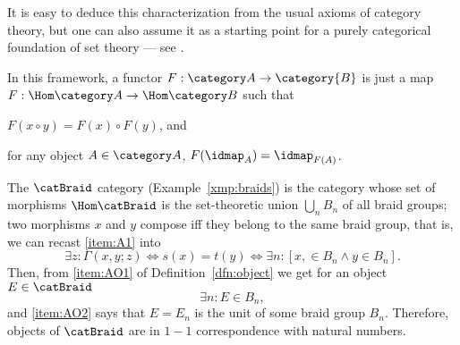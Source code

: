 It is easy to deduce this characterization from the usual axioms of
category theory, but one can also assume it as a starting point for a
purely categorical foundation of set theory --- see
\cite{lawvere;1965}. 

In this framework, a functor $F: \A \to \category{B}$ is just a map $F:
\Hom\A \to \Hom\B$ such that
\begin{inparaenum}
\item $F(x \circ y) = F(x) \circ F(y)$, and
\item for any object $A \in \A$, $F(\idmap_A) = \idmap_{F(A)}$.
\end{inparaenum}

\begin{example}\label{xmp:braid-by-arrows}
  The $\catBraid$ category (Example~\ref{xmp:braids}) is the category whose
  set of morphisms $\Hom\catBraid$ is the set-theoretic union $\bigcup_n
  B_n$ of all braid groups; two morphisms $x$ and $y$ compose iff they
  belong to the same braid group, that is, we can recast \ref{item:A1}
  into
  \begin{equation*}
    \exists z: \Gamma(x,y;z) \Leftrightarrow s(x) = t(y) \Leftrightarrow \exists n: [x, \in B_n \land y \in B_n].
  \end{equation*}
  Then, from \ref{item:AO1} of Definition~\ref{dfn:object} we get for an object
  $E \in \catBraid$
  \begin{equation*}
    \exists n: E \in B_n,
  \end{equation*}
  and \ref{item:AO2} says that $E = E_n$ is the unit of some braid group
  $B_n$. Therefore, objects of $\catBraid$ are in $1-1$ correspondence
  with natural numbers.
\end{example}

